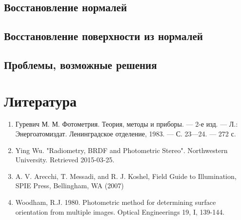 \documentclass[12pt]{article}
\begin{document}





\subsection{Восстановление нормалей}
\subsection{Восстановление поверхности из нормалей}
\subsection{Проблемы, возможные решения}

\section{Литература}
\begin{enumerate}
  \item Гуревич М. М. Фотометрия. Теория, методы и приборы. — 2-е изд. — Л.: Энергоатомиздат. Ленинградское отделение, 1983. — С. 23—24. — 272 с.
  \item Ying Wu. "Radiometry, BRDF and Photometric Stereo". Northwestern University. Retrieved 2015-03-25.
  \item A. V. Arecchi, T. Messadi, and R. J. Koshel, Field Guide to Illumination, SPIE Press, Bellingham, WA (2007)
  \item Woodham, R.J. 1980. Photometric method for determining surface orientation from multiple images. Optical Engineerings 19, I, 139-144.
\end{enumerate}
\end{document}
